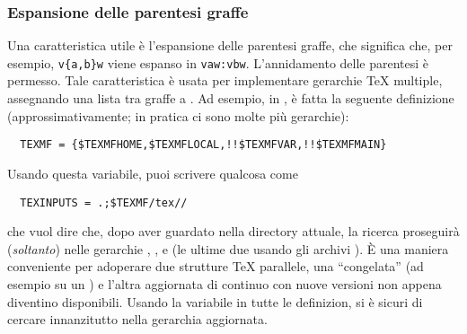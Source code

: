\documentclass{article}
\begin{document}
\subsubsection{Espansione delle parentesi graffe}

Una caratteristica utile è l'espansione delle parentesi graffe, che
significa che, per esempio, \verb+v{a,b}w+ viene espanso in
\verb+vaw:vbw+. L'annidamento delle parentesi è permesso. Tale
caratteristica è usata per implementare gerarchie \TeX{} multiple,
assegnando una lista tra graffe a . Ad esempio, in
, è fatta la seguente definizione (approssimativamente; in
pratica ci sono molte più gerarchie):
\begin{verbatim}
  TEXMF = {$TEXMFHOME,$TEXMFLOCAL,!!$TEXMFVAR,!!$TEXMFMAIN}
\end{verbatim}
Usando questa variabile, puoi scrivere qualcosa come
\begin{verbatim}
  TEXINPUTS = .;$TEXMF/tex//
\end{verbatim}
che vuol dire che, dopo aver guardato nella directory attuale, la ricerca
proseguirà (\emph{soltanto}) nelle gerarchie ,
,  e 
(le ultime due usando gli archivi ). È una maniera conveniente
per adoperare due strutture \TeX{} parallele, una ``congelata'' (ad
esempio su un \CD) e l'altra aggiornata di continuo con nuove versioni non
appena diventino disponibili. Usando la variabile  in tutte
le definizion, si è sicuri di cercare innanzitutto nella gerarchia
aggiornata.
\end{document}
